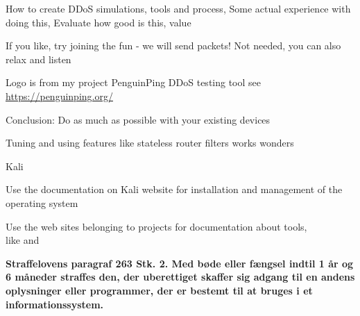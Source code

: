 \documentclass[Screen16to9,17pt]{foils}
\begin{document}


\begin{list1}
\item How to create DDoS simulations, tools and process,
Some actual experience with doing this, Evaluate how good is this, value
\item If you like, try joining the fun - we will send packets! Not needed, you can also relax and listen
\item Logo is from my project PenguinPing DDoS testing tool see \url{https://penguinping.org/}
\end{list1}




\begin{list1}
\item Conclusion: Do as much as possible with your existing devices
\item Tuning and using features like stateless router filters works wonders
\end{list1}





\begin{list1}
\item Kali 
\item Use the documentation on Kali website for installation and management of the operating system
\item Use the web sites belonging to projects for documentation about tools, \\
like  and 
\end{list1}



{\bfseries Straffelovens paragraf 263 Stk. 2. Med bøde eller fængsel indtil 1 år og 6 måneder straffes den, der uberettiget skaffer sig adgang til en andens oplysninger eller programmer, der er bestemt til at bruges i et informationssystem. }
\end{document}
